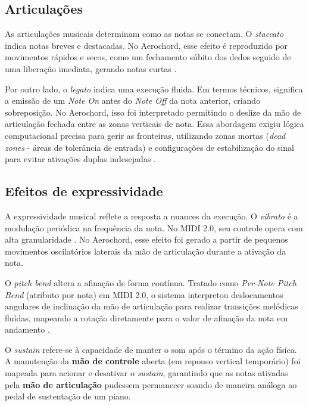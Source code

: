 \subsection{Articulações}
\label{sec:teoria_musical_articulacoes}

As articulações musicais determinam como as notas se conectam. O \textit{staccato} indica notas breves e destacadas. No Aerochord, esse efeito é reproduzido por movimentos rápidos e secos, como um fechamento súbito dos dedos seguido de uma liberação imediata, gerando notas curtas \cite{duckworth2015creative}.

Por outro lado, o \textit{legato} indica uma execução fluida. Em termos técnicos, significa a emissão de um \textit{Note On} antes do \textit{Note Off} da nota anterior, criando sobreposição. No Aerochord, isso foi interpretado permitindo o deslize da mão de articulação fechada entre as zonas verticais de nota. Essa abordagem exigiu lógica computacional precisa para gerir as fronteiras, utilizando zonas mortas (\textit{dead zones} - áreas de tolerância de entrada) e configurações de estabilização do sinal para evitar ativações duplas indesejadas \cite{benward2014music}.

\subsection{Efeitos de expressividade}
\label{sec:teoria_musical_efeitos}

A expressividade musical reflete a resposta a nuances da execução. O \textit{vibrato} é a modulação periódica na frequência da nota. No MIDI 2.0, seu controle opera com alta granularidade \cite{midi_org}. No Aerochord, esse efeito foi gerado a partir de pequenos movimentos oscilatórios laterais da mão de articulação durante a ativação da nota.

O \textit{pitch bend} altera a afinação de forma contínua. Tratado como \textit{Per-Note Pitch Bend} (atributo por nota) em MIDI 2.0, o sistema interpretou deslocamentos angulares de inclinação da mão de articulação para realizar transições melódicas fluídas, mapeando a rotação diretamente para o valor de afinação da nota em andamento \cite{midi_org}.

O \textit{sustain} refere-se à capacidade de manter o som após o término da ação física. A manutenção da \textbf{mão de controle} aberta (em repouso vertical temporário) foi mapeada para acionar e desativar o \textit{sustain}, garantindo que as notas ativadas pela \textbf{mão de articulação} pudessem permanecer soando de maneira análoga ao pedal de sustentação de um piano.

